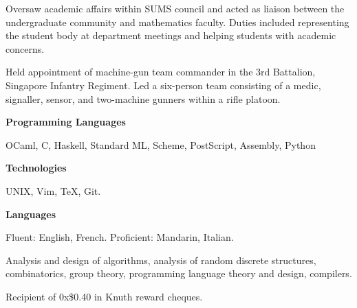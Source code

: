 \smallskip
Oversaw academic affairs within SUMS council and acted as liaison between the undergraduate community and
mathematics faculty. Duties included representing the student body at department meetings and helping students with
academic concerns.
\medskip

\smallskip
Held appointment of machine-gun team commander in the 3rd Battalion, Singapore Infantry Regiment.
Led a six-person team consisting of a medic, signaller, sensor, and two-machine gunners within a rifle platoon.
\medskip


{\bf Programming Languages}\par
OCaml, C, Haskell, Standard ML, Scheme, PostScript, Assembly, Python
\medskip

{\bf Technologies}\par
UNIX, Vim, \TeX, Git.
\medskip

{\bf Languages}\par
Fluent: English, French. Proficient: Mandarin, Italian.
\medskip


Analysis and design of algorithms, analysis of random discrete structures, combinatorics, group theory,
programming language theory and design, compilers.


Recipient of 0x\$0.40 in Knuth reward cheques.

\bye

